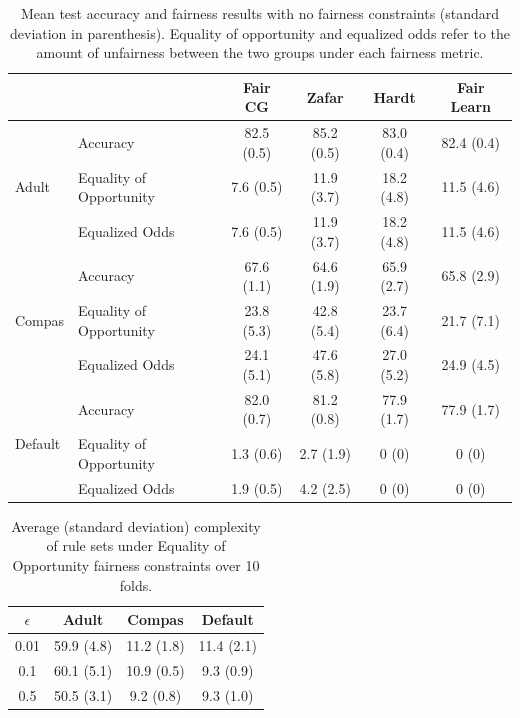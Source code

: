 \documentclass[twoside,11pt]{article}
\begin{document}
\begin{table}[t]
\footnotesize
\centering
\caption{\label{accTableeNoConst} Mean test accuracy and fairness results with no fairness constraints (standard deviation in parenthesis). Equality of opportunity and equalized odds refer to the amount of unfairness between the two groups under each fairness metric.}
\setlength{\tabcolsep}{5pt} %
\begin{tabular}{l l  c c c c }		\toprule
& & Fair CG & Zafar & Hardt & Fair Learn \\\midrule
\multirow{3}{*}{Adult} & Accuracy & 82.5 (0.5) & 85.2 (0.5) & 83.0 (0.4) & 82.4 (0.4) \\
& Equality of Opportunity & 7.6 (0.5) & 11.9 (3.7) & 18.2 (4.8) & 11.5 (4.6) \\
& Equalized Odds & 7.6 (0.5) & 11.9 (3.7) &  18.2 (4.8) & 11.5 (4.6) \\ \midrule
\multirow{3}{*}{Compas} & Accuracy & 67.6 (1.1) & 64.6 (1.9) & 65.9 (2.7) & 65.8 (2.9) \\
& Equality of Opportunity & 23.8 (5.3)& 42.8 (5.4) & 23.7 (6.4) & 21.7 (7.1)  \\
& Equalized Odds &24.1 (5.1) & 47.6 (5.8)& 27.0 (5.2) & 24.9 (4.5) \\ \midrule
\multirow{3}{*}{Default} & Accuracy & 82.0 (0.7) & 81.2 (0.8) & 77.9 (1.7) & 77.9 (1.7) \\
& Equality of Opportunity & 1.3 (0.6) & 2.7 (1.9) & 0 (0) & 0 (0)  \\
& Equalized Odds & 1.9 (0.5) & 4.2 (2.5) & 0 (0) & 0 (0) \\ 
\bottomrule
\end{tabular}%
\end{table}%
\begin{table}[tb]
\centering
\caption{\label{complexity} Average (standard deviation) complexity of rule sets under Equality of Opportunity fairness constraints over 10 folds. }
\setlength{\tabcolsep}{5pt} %
\begin{tabular}{c c c c}		\toprule
$\epsilon$ & Adult & Compas & Default \\ \midrule 
0.01 & 59.9 (4.8) & 11.2 (1.8) & 11.4 (2.1) \\ \midrule 
0.1 & 60.1 (5.1)  & 10.9 (0.5) & 9.3 (0.9) \\ \midrule 
0.5 & 50.5 (3.1) & 9.2 (0.8) & 9.3 (1.0) \\ 
\bottomrule
\end{tabular}%
\end{table}%
\end{document}
